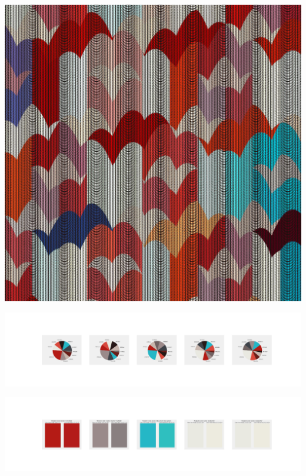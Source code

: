 \documentclass[11pt]{article}
\begin{document}
\begin{landscape}
    \begin{center}
    \includegraphics[width=\textwidth]{./nbimg/file (291).jpg}
    \end{center}

    \begin{center}
    \includegraphics[width=250mm]{./nbimg/pie-213.jpg}
    \end{center}

    \begin{center}
    \includegraphics[width=250mm]{./nbimg/peak-213.jpg}
    \end{center}
    


\end{landscape}
\end{document}
